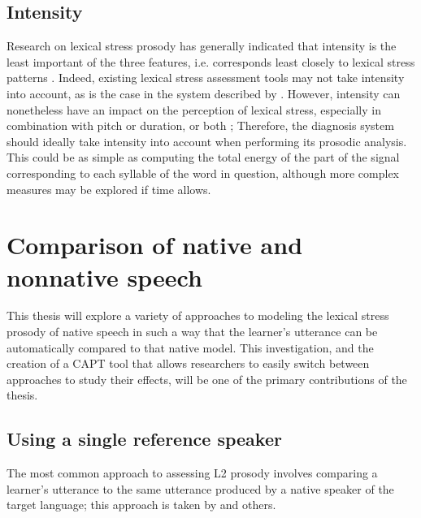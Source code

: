 	\subsection{Intensity}
	\label{sec:prosody:intensity}
		Research on lexical stress prosody has generally indicated that intensity is the least important of the three features, i.e. corresponds least closely to lexical stress patterns \citep{Cutler2005}. 
Indeed, existing lexical stress assessment tools may not take intensity into account, as is the case in the system described by \textcite{Bonneau2011}.  However, intensity can nonetheless have an impact on the perception of lexical stress, especially in combination with pitch or duration, or both \citep{Cutler2005}; %
Therefore, the diagnosis system should ideally take intensity into account when performing its prosodic analysis. This could be as simple as computing the total energy of the part of the signal corresponding to each syllable of the word in question, although more complex measures may be explored if time allows.
	
\section{Comparison of native and nonnative speech}
\label{sec:diag:compare}

	This thesis will explore a variety of approaches to modeling the lexical stress prosody of native speech in such a way that the learner's utterance can be automatically compared to that native model. This investigation, and the creation of a CAPT tool that allows researchers to easily switch between approaches to study their effects, will be one of the primary contributions of the thesis.
	
	\subsection{Using a single reference speaker}
	\label{sec:compare:single}
	
	The most common approach to assessing L2 prosody involves comparing a learner's utterance to the same utterance produced by a native speaker of the target language; this approach is taken by \textcite{Bonneau2011} and others.%
	
